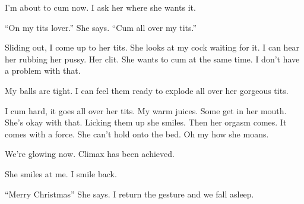      I’m about to cum now. I ask her where 
she wants it. 

     “On my tits lover.” She says. “Cum all 
over my tits.” 

     Sliding out, I come up to her tits. She 
looks at my cock waiting for it. I can hear 
her rubbing her pussy. Her clit. She wants to 
cum at the same time. I don’t have a 
problem with that. 

     My balls are tight. I can feel them ready 
to explode all over her gorgeous tits. 

     I cum hard, it goes all over her tits. My 
warm juices. Some get in her mouth. She’s 
okay with that. Licking them up she smiles. 
Then her orgasm comes. It comes with a 
force. She can’t hold onto the bed. Oh my 
how she moans. 

     We’re glowing now. Climax has been 
achieved. 

     She smiles at me. I smile back. 

     “Merry Christmas” She says. I return the 
gesture and we fall asleep.

